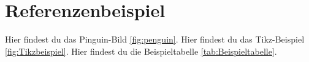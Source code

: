 \section{Referenzenbeispiel}
Hier findest du das Pinguin-Bild \ref{fig:penguin}.
Hier findest du das Tikz-Beispiel \ref{fig:Tikzbeispiel}.
Hier findest du die Beispieltabelle \ref{tab:Beispieltabelle}.